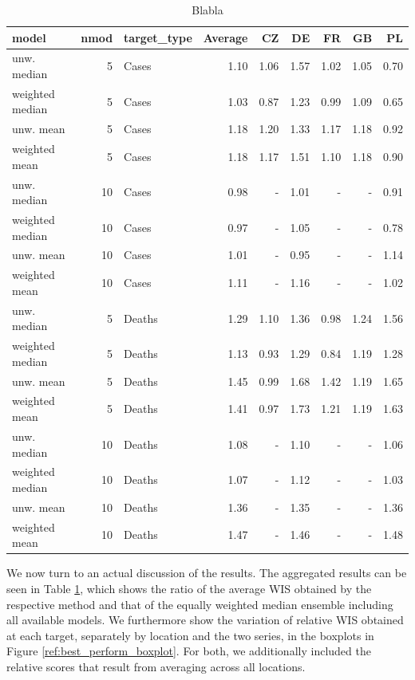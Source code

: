 \begin{table}[t]
\centering
\begin{tabular}{lrlrrrrrr}
\hline
model & nmod & target\_type & Average & CZ & DE & FR & GB & PL\\
\hline
unw. median & 5 & Cases & 1.10 & 1.06 & 1.57 & 1.02 & 1.05 & 0.70\\
weighted median & 5 & Cases & 1.03 & 0.87 & 1.23 & 0.99 & 1.09 & 0.65\\[0.4em]
unw. mean & 5 & Cases & 1.18 & 1.20 & 1.33 & 1.17 & 1.18 & 0.92\\
weighted mean & 5 & Cases & 1.18 & 1.17 & 1.51 & 1.10 & 1.18 & 0.90\\[0.4em]
unw. median & 10 & Cases & 0.98 & - & 1.01 & - & - & 0.91\\
weighted median & 10 & Cases & 0.97 & - & 1.05 & - & - & 0.78\\[0.4em]
unw. mean & 10 & Cases & 1.01 & - & 0.95 & - & - & 1.14\\
weighted mean & 10 & Cases & 1.11 & - & 1.16 & - & - & 1.02\\[0.4em]
unw. median & 5 & Deaths & 1.29 & 1.10 & 1.36 & 0.98 & 1.24 & 1.56\\
weighted median & 5 & Deaths & 1.13 & 0.93 & 1.29 & 0.84 & 1.19 & 1.28\\[0.4em]
unw. mean & 5 & Deaths & 1.45 & 0.99 & 1.68 & 1.42 & 1.19 & 1.65\\
weighted mean & 5 & Deaths & 1.41 & 0.97 & 1.73 & 1.21 & 1.19 & 1.63\\[0.4em]
unw. median & 10 & Deaths & 1.08 & - & 1.10 & - & - & 1.06\\
weighted median & 10 & Deaths & 1.07 & - & 1.12 & - & - & 1.03\\[0.4em]
unw. mean & 10 & Deaths & 1.36 & - & 1.35 & - & - & 1.36\\
weighted mean & 10 & Deaths & 1.47 & - & 1.46 & - & - & 1.48\\
\hline
\end{tabular}
\caption{Blabla}
\label{tab:rel_wis_best_performers}
\end{table}
We now turn to an actual discussion of the results. The aggregated results can be seen in Table \ref{tab:rel_wis_best_performers}, which shows the ratio of the average WIS obtained by the respective method and that of the equally weighted median ensemble including all available models. We furthermore show the variation of relative WIS obtained at each target, separately by location and the two series, in the boxplots in Figure \ref{ref:best_perform_boxplot}. For both, we additionally included the relative scores that result from averaging across all locations.\\
